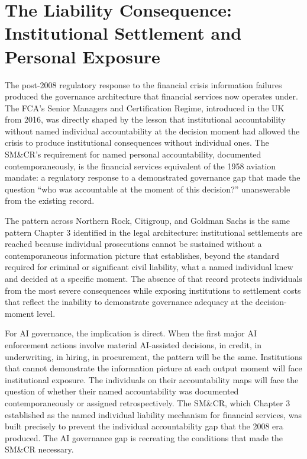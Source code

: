 \scenebreak

\section{The Liability Consequence: Institutional Settlement and Personal Exposure}

The post-2008 regulatory response to the financial crisis information failures produced the governance architecture that financial services now operates under. The FCA's Senior Managers and Certification Regime, introduced in the UK from 2016, was directly shaped by the lesson that institutional accountability without named individual accountability at the decision moment had allowed the crisis to produce institutional consequences without individual ones. The SM\&CR's requirement for named personal accountability, documented contemporaneously, is the financial services equivalent of the 1958 aviation mandate: a regulatory response to a demonstrated governance gap that made the question ``who was accountable at the moment of this decision?'' unanswerable from the existing record.

The pattern across Northern Rock, Citigroup, and Goldman Sachs is the same pattern Chapter 3 identified in the legal architecture: institutional settlements are reached because individual prosecutions cannot be sustained without a contemporaneous information picture that establishes, beyond the standard required for criminal or significant civil liability, what a named individual knew and decided at a specific moment. The absence of that record protects individuals from the most severe consequences while exposing institutions to settlement costs that reflect the inability to demonstrate governance adequacy at the decision-moment level.

For AI governance, the implication is direct. When the first major AI enforcement actions involve material AI-assisted decisions, in credit, in underwriting, in hiring, in procurement, the pattern will be the same. Institutions that cannot demonstrate the information picture at each output moment will face institutional exposure. The individuals on their accountability maps will face the question of whether their named accountability was documented contemporaneously or assigned retrospectively. The SM\&CR, which Chapter 3 established as the named individual liability mechanism for financial services, was built precisely to prevent the individual accountability gap that the 2008 era produced. The AI governance gap is recreating the conditions that made the SM\&CR necessary.

